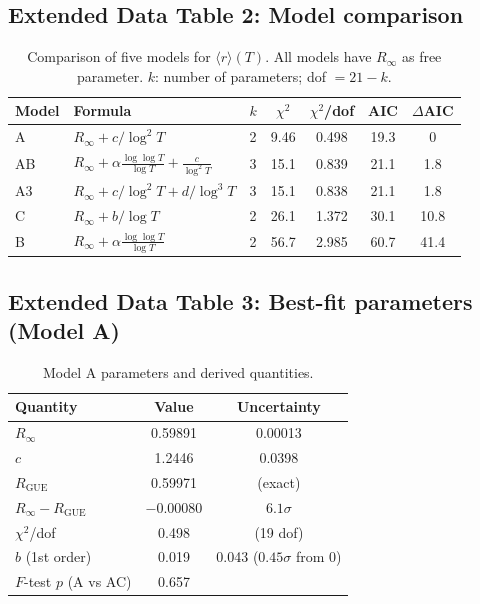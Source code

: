 \documentclass[10pt]{article}
\begin{document}
\subsection{Extended Data Table 2: Model comparison}

\begin{table}[h]
\centering
\caption{Comparison of five models for $\langle r\rangle(T)$.
All models have $R_\infty$ as free parameter. $k$: number of parameters;
dof $= 21 - k$.}
\label{tab:modelcomp}
\begin{tabular}{llccccc}
\toprule
Model & Formula & $k$ & $\chi^2$ & $\chi^2$/dof & AIC & $\Delta$AIC \\
\midrule
A  & $R_\infty + c/\log^2 T$ & 2 & 9.46 & 0.498 & 19.3 & 0 \\
AB & $R_\infty + \alpha\frac{\log\log T}{\log T} + \frac{c}{\log^2 T}$ & 3 & 15.1 & 0.839 & 21.1 & 1.8 \\
A3 & $R_\infty + c/\log^2 T + d/\log^3 T$ & 3 & 15.1 & 0.838 & 21.1 & 1.8 \\
C  & $R_\infty + b/\log T$ & 2 & 26.1 & 1.372 & 30.1 & 10.8 \\
B  & $R_\infty + \alpha\frac{\log\log T}{\log T}$ & 2 & 56.7 & 2.985 & 60.7 & 41.4 \\
\bottomrule
\end{tabular}
\end{table}


\subsection{Extended Data Table 3: Best-fit parameters (Model A)}

\begin{table}[h]
\centering
\caption{Model A parameters and derived quantities.}
\label{tab:params}
\begin{tabular}{lcc}
\toprule
Quantity & Value & Uncertainty \\
\midrule
$R_\infty$ & 0.59891 & 0.00013 \\
$c$ & 1.2446 & 0.0398 \\
$R_{\mathrm{GUE}}$ & 0.59971 & (exact) \\
$R_\infty - R_{\mathrm{GUE}}$ & $-0.00080$ & $6.1\sigma$ \\
$\chi^2$/dof & 0.498 & (19 dof) \\
$b$ (1st order) & 0.019 & 0.043 ($0.45\sigma$ from 0) \\
$F$-test $p$ (A vs AC) & 0.657 & \\
\bottomrule
\end{tabular}
\end{table}
\end{document}
